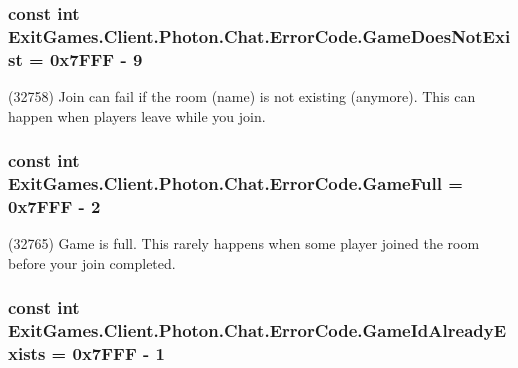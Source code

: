 \subsubsection[{\texorpdfstring{Game\+Does\+Not\+Exist}{GameDoesNotExist}}]{\setlength{\rightskip}{0pt plus 5cm}const int Exit\+Games.\+Client.\+Photon.\+Chat.\+Error\+Code.\+Game\+Does\+Not\+Exist = 0x7\+F\+F\+F -\/ 9}\hypertarget{class_exit_games_1_1_client_1_1_photon_1_1_chat_1_1_error_code_a305ae576c8bcc601f64595333623287a}{}\label{class_exit_games_1_1_client_1_1_photon_1_1_chat_1_1_error_code_a305ae576c8bcc601f64595333623287a}


(32758) Join can fail if the room (name) is not existing (anymore). This can happen when players leave while you join.

\subsubsection[{\texorpdfstring{Game\+Full}{GameFull}}]{\setlength{\rightskip}{0pt plus 5cm}const int Exit\+Games.\+Client.\+Photon.\+Chat.\+Error\+Code.\+Game\+Full = 0x7\+F\+F\+F -\/ 2}\hypertarget{class_exit_games_1_1_client_1_1_photon_1_1_chat_1_1_error_code_aefa4bbc103cc10797c8b695ec03544b0}{}\label{class_exit_games_1_1_client_1_1_photon_1_1_chat_1_1_error_code_aefa4bbc103cc10797c8b695ec03544b0}


(32765) Game is full. This rarely happens when some player joined the room before your join completed.

\subsubsection[{\texorpdfstring{Game\+Id\+Already\+Exists}{GameIdAlreadyExists}}]{\setlength{\rightskip}{0pt plus 5cm}const int Exit\+Games.\+Client.\+Photon.\+Chat.\+Error\+Code.\+Game\+Id\+Already\+Exists = 0x7\+F\+F\+F -\/ 1}\hypertarget{class_exit_games_1_1_client_1_1_photon_1_1_chat_1_1_error_code_a0f067e65b9ee1a19254cddf431cf7f73}{}\label{class_exit_games_1_1_client_1_1_photon_1_1_chat_1_1_error_code_a0f067e65b9ee1a19254cddf431cf7f73}


